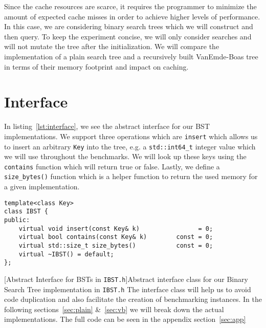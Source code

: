 \documentclass{article}
\begin{document}
Since the cache resources are scarce, it requires the programmer to minimize the amount of expected cache misses in order to achieve higher levels of performance. In this case, we are considering binary search trees which we will construct and then query. To keep the experiment concise, we will only consider searches and will not mutate the tree after the initialization. We will compare the implementation of a plain search tree and a recursively built VanEmde-Boas tree in terms of their memory footprint and impact on caching. 

\section{Interface}
In listing~\ref{lst:interface}, we see the abstract interface for our BST implementations. We support three operations which are \texttt{insert} which allows us to insert an arbitrary \texttt{Key} into the tree, e.g. a \texttt{std::int64\_t} integer value which we will use throughout the benchmarks. We will look up these keys using the \texttt{contains} function which will return true or false. Lastly, we define a \texttt{size\_bytes()} function which is a helper function to return the used memory for a given implementation. 

\begin{lstlisting}
template<class Key>
class IBST {
public:
    virtual void insert(const Key& k)                = 0;
    virtual bool contains(const Key& k)        const = 0;
    virtual std::size_t size_bytes()           const = 0;
    virtual ~IBST() = default;
};
\end{lstlisting}
[Abstract Interface for BSTs in \texttt{IBST.h}]{Abstract interface class for our Binary Search Tree implementation in \texttt{IBST.h}}
\label{lst:interface}
The interface class will help us to avoid code duplication and also facilitate the creation of benchmarking instances. In the following sections~\ref{sec:plain} \&~\ref{sec:vb} we will break down the actual implementations. The full code can be seen in the appendix section~\ref{sec:app}
\end{document}

